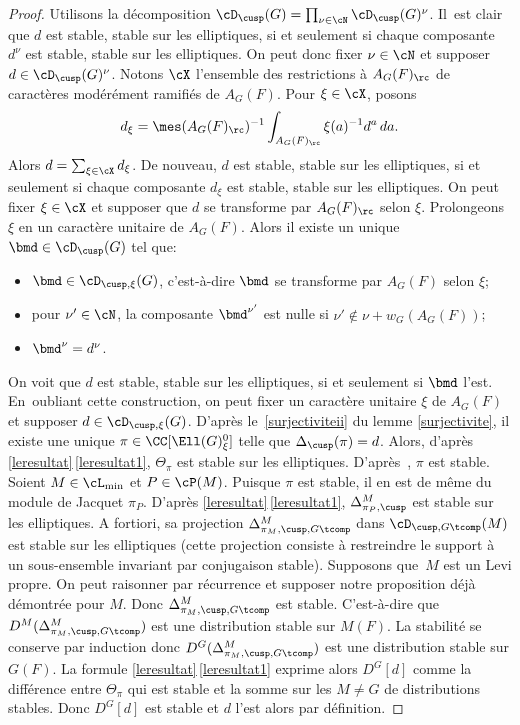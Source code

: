 \begin{proof}
Utilisons la décomposition $\cD_{\cusp}(G)=\prod_{\nu\in \cN}\cD_{\cusp}(G)^{\nu}$. Il~est clair que $d$ est stable, \resp stable sur les elliptiques, si et seulement si chaque composante $d^{\nu}$ est stable, \resp stable sur les elliptiques. On peut donc fixer $\nu\in \cN$ et supposer $d\in \cD_{\cusp}(G)^{\nu}$. Notons $\cX$ l'ensemble des restrictions à $A_{G}(F)_{\rc}$ de caractères modérément ramifiés de $A_{G}(F)$. Pour $\xi\in \cX$, posons
\[
d_{\xi}=\mes(A_{G}(F)_{\rc})^{-1}\int_{A_{G}(F)_{\rc}}\xi(a)^{-1}{d^{a}}\, da.
\]
Alors $d=\sum_{\xi\in \cX}d_{\xi}$. De nouveau, $d$ est stable, \resp stable sur les elliptiques, si et seulement si chaque composante $d_{\xi}$ est stable, \resp stable sur les elliptiques. On peut fixer $\xi\in \cX$ et supposer que $d$ se transforme par $A_{G}(F)_{\rc}$ selon $\xi$. Prolongeons $\xi$ en un caractère unitaire de $A_{G}(F)$. Alors il existe un unique $\bmd\in \cD_{\cusp}(G)$ tel que:
\begin{itemize}
\item
$\bmd\in \cD_{\cusp,\xi}(G)$, c'est-à-dire $\bmd$ se transforme par $A_{G}(F)$ selon $\xi$;

\item
pour $\nu'\in \cN$, la composante $\bmd^{\nu'}$ est nulle si $\nu'\not\in \nu+w_{G}(A_{G}(F))$;

\item
$\bmd^{\nu}=d^{\nu}$.
\end{itemize}

On voit que $d$ est stable, \resp stable sur les elliptiques, si et seulement si $\bmd$ l'est. En~oubliant cette construction, on peut fixer un caractère unitaire $\xi$ de $A_{G}(F)$ et supposer $d\in \cD_{\cusp,\xi}(G)$. D'après le~\eqref{surjectiviteii} du lemme \ref{surjectivite}, il existe une unique $\pi\in \CC[\Ell(G)_{\xi}^0]$ telle que $\Delta_{\cusp}(\pi)=d$. Alors, d'après \ref{leresultat}\,\eqref{leresultat1}, $\Theta_{\pi}$ est stable sur les \hbox{elliptiques}. D'après~\cite[Th.\,6.1]{A3}, $\pi$ est stable. Soient $M\in \cL_{\min}$ et $P\in \cP(M)$. Puisque $\pi$ est stable, il en est de même du module de Jacquet $\pi_{P}$. D'après
\ref{leresultat}\,\eqref{leresultat1}, $\Delta^M_{\pi_{P},\cusp}$ est stable sur les elliptiques. A fortiori, sa projection $\Delta^M_{\pi_{M},\cusp,G\tcomp}$ dans $\cD_{\cusp,G\tcomp}(M)$ est stable sur les elliptiques (cette projection consiste à restreindre le support à un sous-ensemble invariant par conjugaison stable). Supposons que~$M$ est un Levi propre. On peut raisonner par récurrence et supposer notre proposition déjà démontrée pour $M$. Donc $\Delta^M_{\pi_{M},\cusp,G\tcomp}$ est stable. C'est-à-dire que $D^M(\Delta^M_{\pi_{M},\cusp,G\tcomp})$ est une distribution stable sur $M(F)$. La stabilité se conserve par induction donc $D^G(\Delta^M_{\pi_{M},\cusp,G\tcomp})$ est une distribution stable sur $G(F)$. La formule \ref{leresultat}\,\eqref{leresultat1} exprime alors $D^G[d]$ comme la différence entre $\Theta_{\pi}$ qui est stable et la somme sur les $M\neq G$ de distributions stables. Donc $D^G[d]$ est stable et $d$ l'est alors par définition.
\end{proof}

